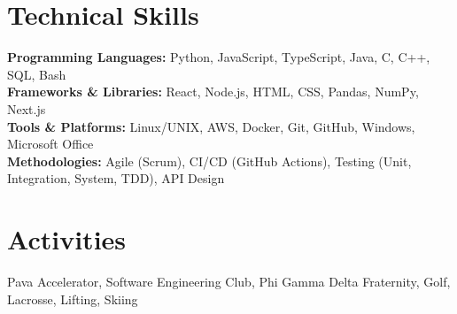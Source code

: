 \documentclass[letterpaper,10pt]{article}
\begin{document}
\section{Technical Skills}
\begin{itemize}[leftmargin=0.15in, label={}]
    \small{
        \item{
            \textbf{Programming Languages:} Python, JavaScript, TypeScript, Java, C, C++, SQL, Bash \\
            \textbf{Frameworks \& Libraries:} React, Node.js, HTML, CSS, Pandas, NumPy, Next.js \\
            \textbf{Tools \& Platforms:} Linux/UNIX, AWS, Docker, Git, GitHub, Windows, Microsoft Office \\
            \textbf{Methodologies:} Agile (Scrum), CI/CD (GitHub Actions), Testing (Unit, Integration, System, TDD), API Design
        }
    }
\end{itemize}

    \section{Activities}
         \begin{itemize}[leftmargin=0.15in, label={}]
            \small{\item{
             {Pava Accelerator, Software Engineering Club, Phi Gamma Delta Fraternity, Golf, Lacrosse, Lifting, Skiing} \\
            }}
         \end{itemize}
\end{document}
